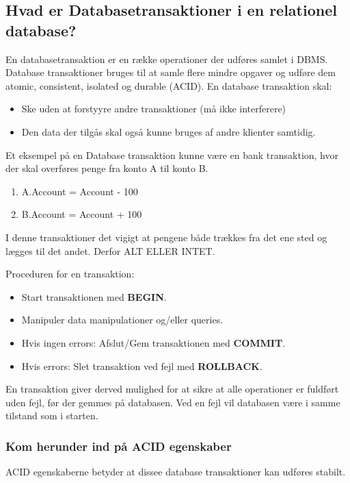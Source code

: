 \newpage

\subsection{Hvad er Databasetransaktioner i en relationel database?}
En databasetransaktion er en række operationer der udføres samlet i DBMS. Database transaktioner bruges til at samle flere mindre opgaver og udføre dem atomic, consistent, isolated og durable (ACID). En database transaktion skal:

\begin{itemize}
	\item Ske uden at forstyyre andre transaktioner (må ikke interferere)
	\item Den data der tilgås skal også kunne bruges af andre klienter samtidig.
\end{itemize}

Et eksempel på en Database transaktion kunne være en bank transaktion, hvor der skal overføres penge fra konto A til konto B.

\begin{enumerate}
	\item A.Account = Account - 100
	\item B.Account = Account + 100 
\end{enumerate}

I denne transaktioner det vigigt at pengene både trækkes fra det ene sted og lægges til det andet. Derfor ALT ELLER INTET.

Proceduren for en transaktion:

\begin{itemize}
	\item Start transaktionen med \textbf{BEGIN}.
	\item Manipuler data manipulationer og/eller queries.
	\item Hvis ingen errors: Afslut/Gem transaktionen med \textbf{COMMIT}.
	\item Hvis errors: Slet transaktion ved fejl med \textbf{ROLLBACK}.
\end{itemize}

En transaktion giver derved mulighed for at sikre at alle operationer er fuldført uden fejl, før der gemmes på databasen. Ved en fejl vil databasen være i samme tilstand som i starten.
\subsubsection{Kom herunder ind på ACID egenskaber}
ACID egenskaberne betyder at dissee database transaktioner kan udføres stabilt.

